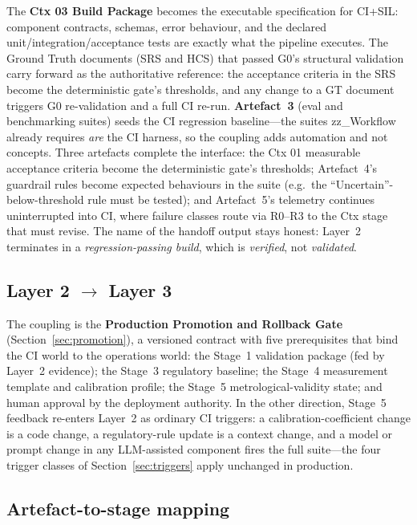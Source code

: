 \documentclass[11pt,a4paper]{article}
\newcommand{\verified}{\emph{verified}}
\newcommand{\validated}{\emph{validated}}
\begin{document}
The \textbf{Ctx 03 Build Package} becomes the executable specification for CI+SIL: component
contracts, schemas, error behaviour, and the declared unit/integration/acceptance tests are
exactly what the pipeline executes. The Ground Truth documents (SRS and HCS) that passed G0's
structural validation carry forward as the authoritative reference: the acceptance criteria in
the SRS become the deterministic gate's thresholds, and any change to a GT document triggers
G0 re-validation and a full CI re-run. \textbf{Artefact~3} (eval and benchmarking suites) seeds
the CI regression baseline---the suites zz\_Workflow already requires \emph{are} the CI harness,
so the coupling adds automation and not concepts. Three artefacts complete the interface: the
Ctx 01 measurable acceptance criteria become the deterministic gate's thresholds; Artefact~4's guardrail
rules become expected behaviours in the suite (e.g.\ the ``Uncertain''-below-threshold rule must
be tested); and Artefact~5's telemetry continues uninterrupted into CI, where failure classes
route via R0--R3 to the Ctx stage that must revise. The name of the handoff output stays honest:
Layer~2 terminates in a \emph{regression-passing build}, which is \verified, not \validated.

\subsection{Layer 2 $\rightarrow$ Layer 3}
\label{sec:l2-l3}

The coupling is the \textbf{Production Promotion and Rollback Gate} (Section~\ref{sec:promotion}), a
versioned contract with five prerequisites that bind the CI world to the operations world: the
Stage~1 validation package (fed by Layer~2 evidence); the Stage~3 regulatory baseline; the Stage~4
measurement template and calibration profile; the Stage~5 metrological-validity state; and human
approval by the deployment authority. In the other direction, Stage~5 feedback re-enters Layer~2
as ordinary CI triggers: a calibration-coefficient change is a code change, a regulatory-rule
update is a context change, and a model or prompt change in any LLM-assisted component fires the
full suite---the four trigger classes of Section~\ref{sec:triggers} apply unchanged in production.

\subsection{Artefact-to-stage mapping}
\label{sec:mapping}
\end{document}

